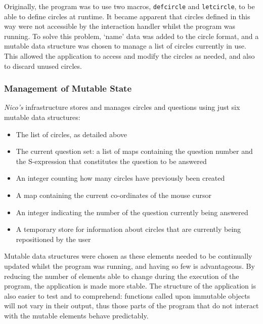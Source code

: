 \documentclass[12pt,twoside,notitlepage,xetex]{report}
\begin{document}
{Originally, the program was to use two macros, \verb¬defcircle¬ and \verb¬letcircle¬, to be able to define circles at runtime.  It became apparent that circles defined in this way were not accessible by the interaction handler whilst the program was running.  To solve this problem, `name' data was added to the circle format, and a mutable data structure was chosen to manage a list of circles currently in use.  This allowed the application to access and modify the circles as needed, and also to discard unused circles.

\subsubsection{Management of Mutable State}

\emph{Nico's} infrastructure stores and manages circles and questions using just six mutable data structures:
\begin{itemize}
\item The list of circles, as detailed above
\item The current question set: a list of maps containing the question number and the S-expression that constitutes the question to be answered
\item An integer counting how many circles have previously been created
\item A map containing the current co-ordinates of the mouse cursor
\item An integer indicating the number of the question currently being answered
\item A temporary store for information about circles that are currently being repositioned by the user
\end{itemize}

Mutable data structures were chosen as these elements needed to be continually updated whilst the program was running, and having so few is advantageous.  By reducing the number of elements able to change during the execution of the program, the application is made more stable.  The structure of the application is also easier to test and to comprehend: functions called upon immutable objects will not vary in their output, thus those parts of the program that do not interact with the mutable elements behave predictably.

%
}
\end{document}
